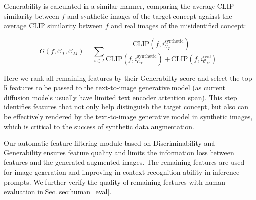 Generability is calculated in a similar manner, comparing the average CLIP similarity between $f$ and synthetic images of the target concept against the average CLIP similarity between $f$ and real images of the misidentified concept:

\vspace{-0.7em}
\[
G(f, \mathcal{C}_T, \mathcal{C}_M) = \sum_{i \in I} \frac{\text{CLIP}(f, i_{\mathcal{C}_T}^{\text{synthetic}})}{\text{CLIP}(f, i_{\mathcal{C}_T}^{\text{synthetic}}) + \text{CLIP}(f, i_{\mathcal{C}_M}^{\text{real}})}
\]
\vspace{-0.7em}

Here we rank all remaining features by their Generability score and select the top 5 features to be passed to the text-to-image generative model (as current diffusion models usually have limited text encoder attention span). This step identifies features that not only help distinguish the target concept, but also can be effectively rendered by the text-to-image generative model in synthetic images, which is critical to the success of synthetic data augmentation.

Our automatic feature filtering module based on Discriminability and Generability ensures feature quality and limits the information loss between features and the generated augmented images. The remaining features are used for image generation and improving in-context recognition ability in inference prompts. We further verify the quality of remaining features with human evaluation in Sec.\ref{sec:human_eval}.








